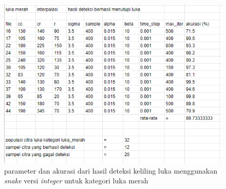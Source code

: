 \begin{figure}[H]
	\centering
	\includegraphics[width=1\textwidth]{gambar/result_merah_good1}
	\caption{parameter dan akurasi dari hasil deteksi keliling luka menggunakan \emph{snake} versi \emph{integer} untuk kategori luka merah}
	\label{Gambar:result_merah_good1}
\end{figure}